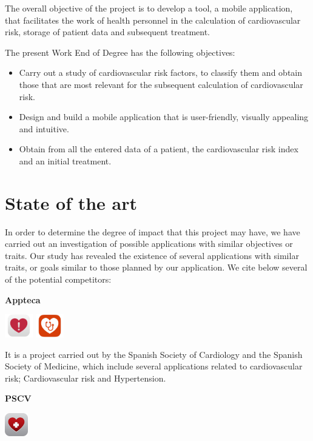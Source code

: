 \documentclass[11pt,spanish,
		listoftables,listoffigures]
		{tfgplantilla}
\begin{document}
The overall objective of the project is to develop a tool, a mobile application, that facilitates the work of health personnel in the calculation of cardiovascular risk, storage of patient data and subsequent treatment.

The present Work End of Degree has the following objectives:
\begin{itemize}
	\item Carry out a study of cardiovascular risk factors, to classify them and obtain those that are most relevant for the subsequent calculation of cardiovascular risk.
	\item Design and build a mobile application that is user-friendly, visually appealing and intuitive.
	\item Obtain from all the entered data of a patient, the cardiovascular risk index and an initial treatment.
\end{itemize}

\section{State of the art}

In order to determine the degree of impact that this project may have, we have carried out an investigation of possible applications with similar objectives or traits. Our study has revealed the existence of several applications with similar traits, or goals similar to those planned by our application. We cite below several of the potential competitors:

\noindent
\textbf {Appteca }

\noindent
\includegraphics[height=1cm]{riesgo-cardiovascular_icon.jpg}  
\includegraphics[height=1cm]{hipertension_icon.jpg}

\noindent
It is a project carried out by the Spanish Society of Cardiology and the Spanish Society of Medicine, which include several applications related to cardiovascular risk; Cardiovascular risk and Hypertension.

\noindent
\textbf {PSCV}

\noindent
\includegraphics[height=1cm]{PSCV_icon.jpg}
\end{document}
